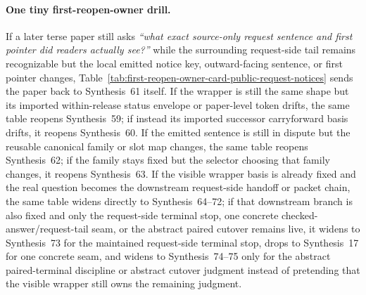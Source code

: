 \documentclass[11pt]{article}
\begin{document}
\paragraph{One tiny first-reopen-owner drill.}
If a later terse paper still asks \emph{``what exact source-only request sentence and first pointer did readers actually see?''} while the surrounding request-side tail remains recognizable but the local emitted notice key, outward-facing sentence, or first pointer changes, Table~\ref{tab:first-reopen-owner-card-public-request-notices} sends the paper back to Synthesis~61 itself. If the wrapper is still the same shape but its imported within-release status envelope or paper-level token drifts, the same table reopens Synthesis~59; if instead its imported successor carryforward basis drifts, it reopens Synthesis~60. If the emitted sentence is still in dispute but the reusable canonical family or slot map changes, the same table reopens Synthesis~62; if the family stays fixed but the selector choosing that family changes, it reopens Synthesis~63. If the visible wrapper basis is already fixed and the real question becomes the downstream request-side handoff or packet chain, the same table widens directly to Synthesis~64--72; if that downstream branch is also fixed and only the request-side terminal stop, one concrete checked-answer/request-tail seam, or the abstract paired cutover remains live, it widens to Synthesis~73 for the maintained request-side terminal stop, drops to Synthesis~17 for one concrete seam, and widens to Synthesis~74--75 only for the abstract paired-terminal discipline or abstract cutover judgment instead of pretending that the visible wrapper still owns the remaining judgment.\cite{series:publicrequeststatusenvelopes,series:publicrequestcarryforward,series:publicrequestnoticenormalforms,series:publicrequestnoticeselections,series:publicrequestresponsemenus,series:publicrequestresponsepackets,series:publicrequestresponsepacketcarryforward,series:publicrequestresponsepacketdeltaledgers,series:publicrequestresponsepacketrefreshnotices,series:publicrequestresponsepacketrefreshnoticenormalforms,series:publicrequestresponsepacketrefreshnoticeselections,series:publicrequestresponsepacketrefreshresponsemenus,series:publicrequestresponsepacketrefreshresponsepackets,series:publicrequestresponsepacketrefreshresponsepacketclosureverdicts,series:pairedterminalcitationdiscipline,series:pairedterminalcutoverrule}
\end{document}
